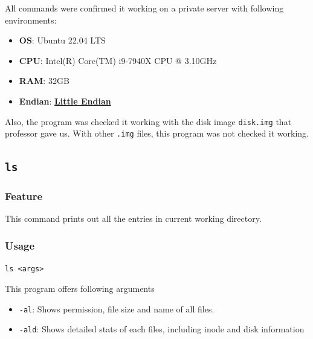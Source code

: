 \documentclass{homework}
\begin{document}
All commands were confirmed it working on a private server with following environments:
\begin{itemize}
    \item \textbf{OS}: Ubuntu 22.04 LTS
    \item \textbf{CPU}: Intel(R) Core(TM) i9-7940X CPU @ 3.10GHz
    \item \textbf{RAM}: 32GB
    \item \textbf{Endian}: \underline\textbf{Little Endian}
\end{itemize}
Also, the program was checked it working with the disk image \texttt{disk.img} that professor gave us. With other \texttt{.img} files, this program was not checked it working.
\pagebreak

\subsection{\texttt{ls}}
\subsubsection{Feature}
This command prints out all the entries in current working directory.
\subsubsection{Usage}
\begin{center}
\texttt{ls <args>}
\end{center}
This program offers following arguments
\begin{itemize}
    \item \texttt{-al}: Shows permission, file size and name of all files.
    \item \texttt{-ald}: Shows detailed stats of each files, including inode and disk information
\end{itemize}
\end{document}
